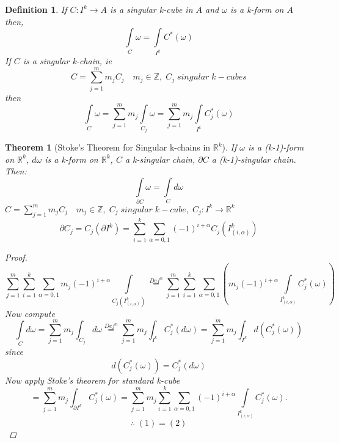 \documentclass[11pt]{article}
\def\RR{\mathbb{R}}
\def\ZZ{\mathbb{Z}}
\newtheorem{theorem}{Theorem}[section]
\newtheorem{definition}{Definition}[section]
\begin{document}
\begin{definition}
If $C:I^k \rightarrow A$ is a singular k-cube in $A$ and $\omega$ is a k-form on $A$ then, 
\[\int\limits_{C} \omega = \int\limits_{I^k} C^*(\omega)\]
If $C$ is a singular k-chain, ie 
\[C= \sum_{j=1}^m m_jC_j \quad m_j \in \ZZ, \;C_j\;singular \; k-cubes\]
then
\[\int\limits_{C} \omega = \sum_{j=1}^m m_j\int\limits_{C_j}\omega = \sum_{j=1}^m m_j\int\limits_{I^k}C_j^*(\omega )\]
\end{definition}

\setcounter{equation}{0}

\begin{theorem}[Stoke's Theorem for Singular k-chains in $\RR^k$]
If $\omega$ is a (k-1)-form on $\RR^k$, $d\omega$ is a k-form on $\RR^k$, $C$ a k-singular chain, $\partial C$ a (k-1)-singular chain. Then:
\[\int\limits_{\partial C} \omega = \int\limits_{C} d\omega\]
$C= \sum_{j=1}^m m_jC_j \quad m_j \in \ZZ, \;C_j\;singular \; k-cube, \;C_j:I^k\rightarrow \RR^k$
\[\partial C_j = C_j(\partial I^k) = \sum_{i=1}^k \sum_{\alpha =0,1} (-1)^{i+\alpha} C_j (I_{(i,\alpha)}^k)\]
\begin{proof}
\begin{equation} \sum_{j=1}^m \sum_{i=1}^k \sum_{\alpha =0,1}m_j (-1)^{i+\alpha} \int\limits_{C_j (I_{(i,\alpha)}^k)} \overset{Def^n}{=} \sum_{j=1}^m \sum_{i=1}^k \sum_{\alpha =0,1} \left( m_j (-1)^{i+\alpha} \int\limits_{I_{(i,\alpha)}^k} C_j^*(\omega)\right) \end{equation}
Now compute 
\[
\int\limits_{C}d\omega = \sum_{j=1}^m m_j \int_{C_j} d\omega \overset{Def^n}{=} \sum_{j=1}^m m_j \int_{I^k} C_j^*(d\omega) =  \sum_{j=1}^m m_j \int_{I^k} d(C_j^*(\omega)) \]
since \[\boxed{d(C_j^*(\omega)) = C_j^*(d\omega)}\]
Now apply Stoke's theorem for standard k-cube
\begin{equation}
= \sum_{j=1}^m m_j \int_{\partial I^k} C_j^*(\omega) =  \sum_{j=1}^m m_j \sum_{i=1}^k \sum_{\alpha =0,1}   (-1)^{i+\alpha} \int\limits_{I_{(i,\alpha)}^k} C_j^*(\omega). \end{equation}
\[\therefore \; (1)=(2)\]
\end{proof}
\end{theorem}
\end{document}
